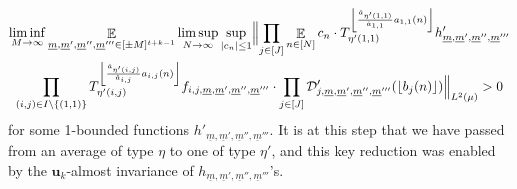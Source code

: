 \documentclass[11pt]{amsart}
\theoremstyle{definition}
\DeclareMathOperator*{\E}{\mathbb{E}}
\newcommand{\CD}{{\mathcal D}}
\newcommand{\bu}{{\mathbf{u}}}
\newcommand{\um}{{\underline{m}}}
\newcommand{\1}{{\mathbf{1}}}
\newcommand{\floor}[1]{{\left \lfloor #1 \right \rfloor}}
\begin{document}
\begin{multline}\label{qtrgg1}
       \liminf_{M\to\infty}\E_{\um, \um',\um'',\um'''\in [\pm M]^{t+k-1}}\limsup_{N\to\infty} \sup_{|c_n|\leq 1}\Bigl\Vert
   \prod_{j\in[J]}\E_{n\in[N]}c_n\cdot T_{\eta'(1,1)}^{\floor{\frac{\hat{a}_{\eta'(1,1)}}{\hat{a}_{1,1}}a_{1,1}(n)}} h'_{\um,\um',\um'',\um'''}
   \\\prod_{(i,j)\in I\backslash\{(1,1)\}}T_{\eta'(i,j)}^{\floor{\frac{\hat{a}_{\eta'(i,j)}}{\hat{a}_{i,j}}a_{i,j}(n)}}f_{i,j,\um,\um',\um'',\um'''}\cdot  \prod_{j\in[J]} \CD'_{j,\um,\um',\um'',\um'''}(\floor{b_j(n)})\Bigr\Vert_{L^2(\mu)}>0
\end{multline}
 for some 1-bounded functions $h'_{\um,\um',\um'',\um'''}$. It is at this step that we have passed from an average of type $\eta$ to one of type $\eta'$, and this key reduction was enabled by the $\bu_k$-almost invariance of $h_{\um,\um',\um'',\um'''}$'s.
      
\end{document}
